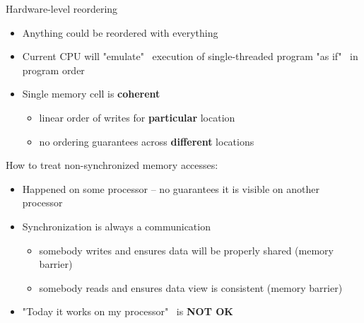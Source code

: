 \begin{frame}{Hardware-level reordering}

\pause
\begin{itemize}
 \item Anything could be reordered with everything 
 \pause
 \pause
 \pause
 \item Current CPU will "emulate" \ execution of single-threaded program "as if" \ in program order
 \pause
 \item Single memory cell is \textbf{coherent} 
 \begin{itemize}
    \pause
    \item linear order of writes for \textbf{particular} location
    \pause
    \item no ordering guarantees across \textbf{different} locations 
 \end{itemize}
\end{itemize}

\pause
How to treat non-synchronized memory accesses:
\begin{itemize}
    \pause
    \item Happened on some processor -- no guarantees it is visible on another processor
    \pause
    \item Synchronization is always a communication
    \begin{itemize}
        \pause
        \item somebody writes and ensures data will be properly shared (memory barrier)
        \pause
        \item somebody reads and ensures data view is consistent (memory barrier)
    \end{itemize}
    \pause
    \item "Today it works on my processor" \ is \textbf{NOT OK}
\end{itemize}


\end{frame}


